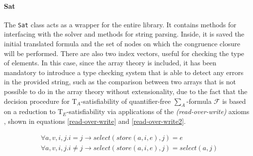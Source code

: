 \documentclass{IEEEtran}
\begin{document}
\paragraph{Sat}
The \verb|Sat| class acts as a wrapper for the entire library. It contains methods for interfacing with the solver and methods for string parsing. Inside, it is saved the initial translated formula and the set of nodes on which the congruence closure will be performed. There are also two index vectors, useful for checking the type of elements. In this case, since the array theory is included, it has been mandatory to introduce a type checking system that is able to detect any errors in the provided string, such as the comparison between two arrays that is not possible to do in the array theory without extensionality, due to the fact that the decision procedure for T$_A$-satisfiability of quantifier-free $\sum_A$-formula $\mathcal{F}$ is based on a reduction to T$_E$-satisfiability via applications of the \textit{(read-over-write)} axioms \cite{10.5555/1324777}, shown in equations \ref{read-over-write} and \ref{read-over-write2}.

\begin{align}
	\label{read-over-write}
	&\forall a,v,i,j. i = j \to select(store(a,i,e),j) = e \\
	\label{read-over-write2}
	&\forall a,v,i,j. i \ne j \to select(store(a,i,e),j) = select(a,j)
\end{align}
\end{document}
